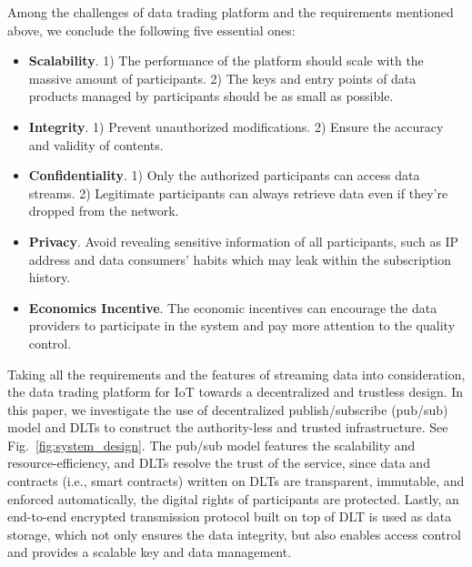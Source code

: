 \documentclass[conference]{IEEEtran}
\begin{document}
Among the challenges of data trading platform\cite{BigDataMarket} and the requirements mentioned above, we conclude the following five essential ones:
\begin{itemize}
	\item \textbf{Scalability}. 
1) The performance of the platform should scale with the massive amount of participants. 2) The keys and entry points of data products managed by participants should be as small as possible. 
	\item \textbf{Integrity}. 1) Prevent unauthorized modifications. 2) Ensure the accuracy and validity of contents.	
	\item \textbf{Confidentiality}. 
1) Only the authorized participants can access data streams. 2) Legitimate participants can always retrieve data even if they're dropped from the network.	
	\item \textbf{Privacy}. Avoid revealing sensitive information of all participants, such as IP address and data consumers' habits which may leak within the subscription history.
	\item \textbf{Economics Incentive}. The economic incentives can encourage the data providers to participate in the system and pay more attention to the quality control. 
\end{itemize}

Taking all the requirements and the features of streaming data into consideration, the data trading platform for IoT towards a decentralized and trustless design. In this paper, we investigate the use of decentralized publish/subscribe (pub/sub) model and DLTs to construct the authority-less and trusted infrastructure. See Fig.~\ref{fig:system_design}. The pub/sub model features the scalability and resource-efficiency, and DLTs resolve the trust of the service, since data and contracts (i.e., smart contracts) written on DLTs are transparent, immutable, and enforced automatically, the digital rights of participants are protected. Lastly, an end-to-end encrypted transmission protocol built on top of DLT is used as data storage, which not only ensures the data integrity, but also enables access control and provides a scalable key and data management.
\end{document}
